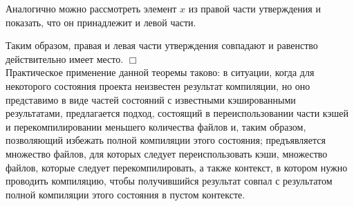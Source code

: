 Аналогично можно рассмотреть элемент $x$ из правой части утверждения и показать, что он принадлежит и левой части.

Таким образом, правая и левая части утверждения совпадают и равенство действительно имеет место. $\Box$\\

Практическое применение данной теоремы таково: в ситуации, когда для некоторого состояния проекта неизвестен результат компиляции, но оно представимо в виде частей состояний с известными кэшированными результатами, предлагается подход, состоящий в переиспользовании части кэшей и перекомпилировании меньшего количества файлов и, таким образом, позволяющий избежать полной компиляции этого состояния; предъявляется множество файлов, для которых следует переиспользовать кэши, множество файлов, которые следует перекомпилировать, а также контекст, в котором нужно проводить компиляцию, чтобы получившийся результат совпал с результатом полной компиляции этого состояния в пустом контексте.